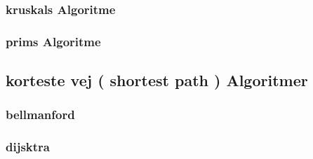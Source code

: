 \documentclass[letterpaper,10pt,danish]{sphinxmanual}
\begin{document}
\subsubsection{kruskals Algoritme}
\label{\detokenize{Algorithmer/Graphs:kruskals-algoritme}}
\sphinxAtStartPar
{}


\subsubsection{prims Algoritme}
\label{\detokenize{Algorithmer/Graphs:prims-algoritme}}
\sphinxAtStartPar
{}


\subsection{korteste vej ( shortest path ) Algoritmer}
\label{\detokenize{Algorithmer/Graphs:korteste-vej-shortest-path-algoritmer}}

\subsubsection{bellman\sphinxhyphen{}ford}
\label{\detokenize{Algorithmer/Graphs:bellman-ford}}
\sphinxAtStartPar
{}


\subsubsection{dijsktra}
\label{\detokenize{Algorithmer/Graphs:dijsktra}}
\sphinxAtStartPar
{}



\renewcommand{\indexname}{Indeks}
\printindex
\end{document}
